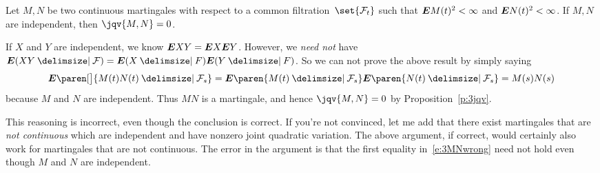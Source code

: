 \begin{proposition}
  Let $M, N$ be two continuous martingales with respect to a common filtration~$\set{\mathcal F_t}$ such that $\bm{E} M(t)^2 < \infty$ and $\bm{E} N(t)^2 < \infty$.
  If $M,N$ are independent, then $\jqv{M,N} = 0$.
\end{proposition}
\begin{remark}
  If $X$ and $Y$ are independent, we know $\bm{E} XY = \bm{E} X \bm{E} Y$.
  However, we \emph{need not} have $\E (XY \given \mathcal F) = \E(X \given F) \E (Y \given F)$.
  So we can not prove the above result by simply saying
  \begin{equation}\label{e:3MNwrong}
    \E \paren[\big]{ M(t) N(t) \given \mathcal F_s }
      = \E \paren{ M(t) \given \mathcal F_s }
	  \E \paren{ N(t) \given \mathcal F_s }
      = M(s) N(s)
  \end{equation}
  because $M$ and $N$ are independent.
  Thus  $MN$ is a martingale, and hence $\jqv{M,N} = 0$ by Proposition~\ref{p:3jqv}.

  This reasoning is incorrect, even though the conclusion is correct.
  If you're not convinced, let me add that there exist martingales that are \emph{not continuous} which are independent and have nonzero joint quadratic variation.
  The above argument, if correct, would certainly also work for martingales that are not continuous.
  The error in the argument is that the first equality in~\eqref{e:3MNwrong} need not hold even though $M$ and $N$ are independent.
\end{remark}
